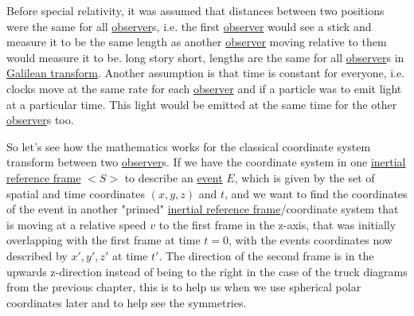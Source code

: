 Before special relativity, it was assumed that distances between two positions were the same for all \hyperlink{def-observer}{observer}s, i.e. the first \hyperlink{def-observer}{observer} would see a stick and measure it to be the same length as another \hyperlink{def-observer}{observer} moving relative to them would measure it to be. long story short, lengths are the same for all \hyperlink{def-observer}{observer}s in \hyperlink{def-galilean-transform}{Galilean transform}. Another assumption is that time is constant for everyone, i.e. clocks move at the same rate for each \hyperlink{def-observer}{observer} and if a particle was to emit light at a particular time. This light would be emitted at the same time for the other \hyperlink{def-observer}{observer}s too.

So let's see how the mathematics works for the classical coordinate system transform between two \hyperlink{def-observer}{observer}s. If we have the coordinate system in one \hyperlink{def-Inertial-reference-frame}{inertial reference frame} $<S>$ to describe an \hyperlink{def-event}{event} $E$, which is given by the set of spatial and time coordinates $(x,y,z)$ and $t$, and we want to find the coordinates of the event in another "primed" \hyperlink{def-Inertial-reference-frame}{inertial reference frame}/coordinate system that is moving at a relative speed $v$ to the first frame in the z-axis, that was initially overlapping with the first frame at time $t=0$, with the events coordinates now described by $x', y', z'$ at time $t'$. The direction of the second frame is in the upwards z-direction instead of being to the right in the case of the truck diagrams from the previous chapter, this is to help us when we use spherical polar coordinates later and to help see the symmetries.

